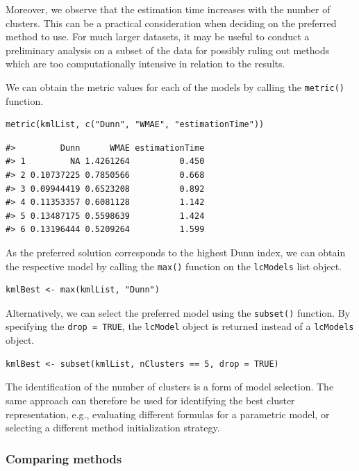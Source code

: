 Moreover, we observe that the estimation time increases with the number of clusters. This can be a practical consideration when deciding on the preferred method to use. For much larger datasets, it may be useful to conduct a preliminary analysis on a subset of the data for possibly ruling out methods which are too computationally intensive in relation to the results.

We can obtain the metric values for each of the models by calling the \texttt{metric()} function.

\begin{verbatim}
metric(kmlList, c("Dunn", "WMAE", "estimationTime"))
\end{verbatim}

\begin{verbatim}
#>         Dunn      WMAE estimationTime
#> 1         NA 1.4261264          0.450
#> 2 0.10737225 0.7850566          0.668
#> 3 0.09944419 0.6523208          0.892
#> 4 0.11353357 0.6081128          1.142
#> 5 0.13487175 0.5598639          1.424
#> 6 0.13196444 0.5209264          1.599
\end{verbatim}

As the preferred solution corresponds to the highest Dunn index, we can obtain the respective model by calling the \texttt{max()} function on the \texttt{lcModels} list object.

\begin{verbatim}
kmlBest <- max(kmlList, "Dunn")
\end{verbatim}

Alternatively, we can select the preferred model using the \texttt{subset()} function. By specifying the \texttt{drop\ =\ TRUE}, the \texttt{lcModel} object is returned instead of a \texttt{lcModels} object.

\begin{verbatim}
kmlBest <- subset(kmlList, nClusters == 5, drop = TRUE)
\end{verbatim}

The identification of the number of clusters is a form of model selection. The same approach can therefore be used for identifying the best cluster representation, e.g., evaluating different formulas for a parametric model, or selecting a different method initialization strategy.

\subsubsection{Comparing methods}\label{comparing-methods}

